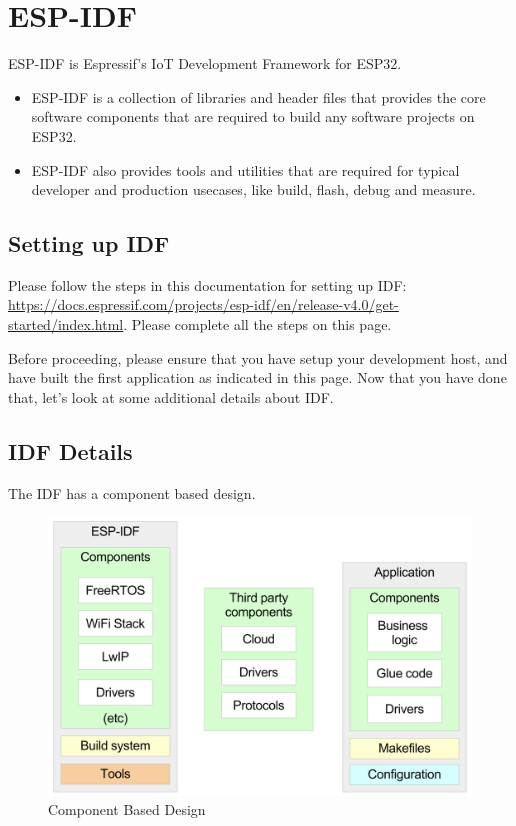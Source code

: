 \documentclass[main.tex]{subfiles}
\begin{document}
\section{ESP-IDF}

ESP-IDF is Espressif's IoT Development Framework for ESP32. 
\begin{itemize}
    \item ESP-IDF is a collection of libraries and header files that provides the core software components that are required to build any software projects on ESP32. 
    \item ESP-IDF also provides tools and utilities that are required for typical developer and production usecases, like build, flash, debug and measure.
\end{itemize}

\subsection{Setting up IDF}

Please follow the steps in this documentation for setting up IDF: \url{https://docs.espressif.com/projects/esp-idf/en/release-v4.0/get-started/index.html}. Please complete all the steps on this page.

Before proceeding, please ensure that you have setup your development host, and have built the first application as indicated in this page. Now that you have done that, let's look at some additional details about IDF.

\subsection{IDF Details}

The IDF has a component based design.

\begin{figure}[h!]
    \centering
    \includegraphics[width=\textwidth]{../../_static/idf_comp.png}
    \caption{Component Based Design}
    \label{fig:idf_comp_design}
\end{figure}
\end{document}
